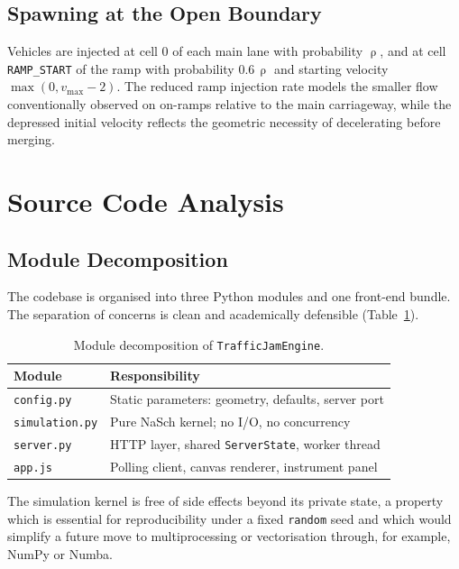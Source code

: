 \documentclass[11pt,a4paper]{article}
\DeclareMathOperator{\dens}{\rho}
\begin{document}
\subsection{Spawning at the Open Boundary}

Vehicles are injected at cell $0$ of each main lane with probability
$\dens$, and at cell \texttt{RAMP\_START} of the ramp with probability
$0.6\,\dens$ and starting velocity $\max(0,v_{\max}-2)$. The reduced
ramp injection rate models the smaller flow conventionally observed on
on-ramps relative to the main carriageway, while the depressed initial
velocity reflects the geometric necessity of decelerating before
merging.

\section{Source Code Analysis}

\subsection{Module Decomposition}

The codebase is organised into three Python modules and one front-end
bundle. The separation of concerns is clean and academically defensible
(Table~\ref{tab:modules}).

\begin{table}[H]
\centering
\small
\begin{tabular}{ll}
\toprule
Module & Responsibility \\
\midrule
\texttt{config.py}     & Static parameters: geometry, defaults, server port \\
\texttt{simulation.py} & Pure NaSch kernel; no I/O, no concurrency \\
\texttt{server.py}     & HTTP layer, shared \texttt{ServerState}, worker thread \\
\texttt{app.js}        & Polling client, canvas renderer, instrument panel \\
\bottomrule
\end{tabular}
\caption{Module decomposition of \texttt{TrafficJamEngine}.}
\label{tab:modules}
\end{table}

The simulation kernel is free of side effects beyond its private state, a
property which is essential for reproducibility under a fixed
\texttt{random} seed and which would simplify a future move to
multiprocessing or vectorisation through, for example, NumPy or Numba.
\end{document}
